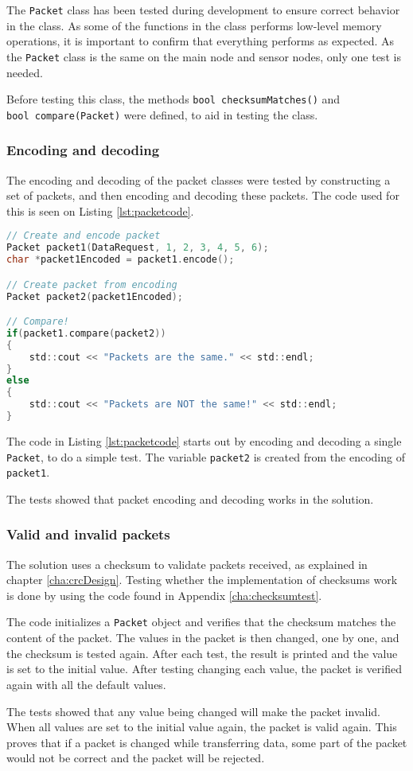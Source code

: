 The \texttt{Packet} class has been tested during development to ensure correct behavior in the class. As some of the functions in the class performs low-level memory operations, it is important to confirm that everything performs as expected. As the \texttt{Packet} class is the same on the main node and sensor nodes, only one test is needed.

Before testing this class, the methods \texttt{bool checksumMatches()} and \\ \texttt{bool compare(Packet)} were defined, to aid in testing the class.

\subsubsection*{Encoding and decoding}
The encoding and decoding of the packet classes were tested by constructing a set of packets, and then encoding and decoding these packets. The code used for this is seen on Listing \ref{lst:packetcode}.

\begin{lstlisting}[language=C,label={lst:packetcode},caption={Testing packet encoding/decoding.}]
// Create and encode packet
Packet packet1(DataRequest, 1, 2, 3, 4, 5, 6);
char *packet1Encoded = packet1.encode();

// Create packet from encoding
Packet packet2(packet1Encoded);

// Compare!
if(packet1.compare(packet2))
{
    std::cout << "Packets are the same." << std::endl;
}
else
{
    std::cout << "Packets are NOT the same!" << std::endl;
}
\end{lstlisting}
The code in Listing \ref{lst:packetcode} starts out by encoding and decoding a single \texttt{Packet}, to do a simple test. The variable \texttt{packet2} is created from the encoding of \texttt{packet1}. 

The tests showed that packet encoding and decoding works in the solution.

\subsubsection*{Valid and invalid packets}
The solution uses a checksum to validate packets received, as explained in chapter \ref{cha:crcDesign}. Testing whether the implementation of checksums work is done by using the code found in Appendix \ref{cha:checksumtest}.


The code initializes a \texttt{Packet} object and verifies that the checksum matches the content of the packet. The values in the packet is then changed, one by one, and the checksum is tested again. After each test, the result is printed and the value is set to the initial value. After testing changing each value, the packet is verified again with all the default values.

The tests showed that any value being changed will make the packet invalid. When all values are set to the initial value again, the packet is valid again.
This proves that if a packet is changed while transferring data, some part of the packet would not be correct and the packet will be rejected.
